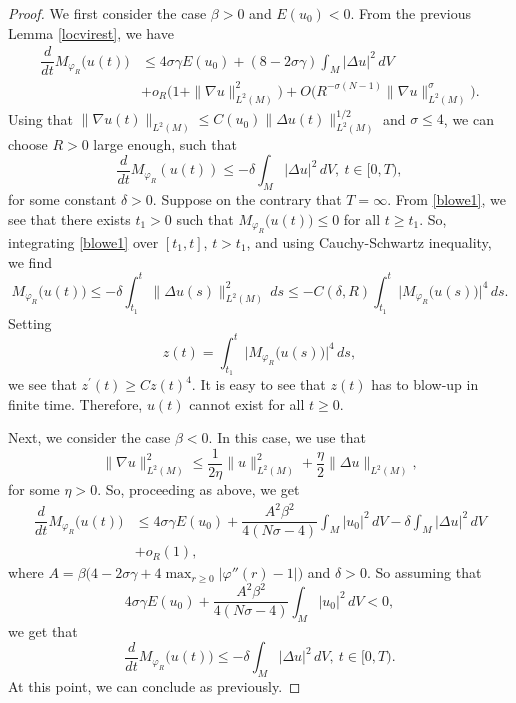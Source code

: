 \documentclass[10pt,leqno]{amsart}
\numberwithin{equation}{section}
\begin{document}
\begin{proof}
We first consider the case $\beta> 0$ and $E(u_0)<0$. From the previous Lemma \ref{locvirest}, we have
\begin{align*}
\dfrac{d}{dt}M_{\varphi_R} \big(u(t)\big)& \leq 4 \sigma \gamma E (u_0)+(8-2\sigma \gamma) \int_M |\Delta u|^2\, dV \\
& +o_R \big(1+\|\nabla u\|^2_{L^2(M)}\big)+O\big( R^{-\sigma (N-1)} \|\nabla u\|_{L^2 (M)}^{\sigma}\big). 
\end{align*}
Using that $\|\nabla u(t)\|_{L^2 (M)}\leq C(u_0) \|\Delta u (t)\|_{L^2 (M)}^{1/2} $ and $\sigma \leq 4$, we can choose $R>0$ large enough, such that
\begin{equation}
\label{blowe1}
\dfrac{d}{dt}M_{\varphi_R} (u(t)) \leq  -\delta \int_M |\Delta u|^2\, dV,\ t\in [0,T), 
\end{equation}
for some constant $\delta>0$. Suppose on the contrary  that $T=\infty$. From \eqref{blowe1}, we see that there exists $t_1 >0$ such that $M_{\varphi_R} \big(u(t)\big) \leq 0$ for all $t\geq t_1$. So, integrating \eqref{blowe1} over $[t_1 ,t]$, $t>t_1$, and using Cauchy-Schwartz inequality, we find
$$M_{\varphi_R} \big(u(t)\big) \leq -\delta \int_{t_1}^t \|\Delta u(s)\|_{L^2 (M)}^2\, ds\leq - C(\delta ,R) \int_{t_1}^t \big|M_{\varphi_R} \big(u(s)\big) \big|^4\, ds . $$
Setting 
\[
z(t)= \int_{t_1}^t \big|M_{\varphi_R} \big(u(s)\big) \big|^4\, ds,
\]
 we see that $z^\prime (t) \geq C z(t)^4$. It is easy to see that $z(t)$ has to blow-up in finite time. Therefore, $u(t)$ cannot exist for all $t\geq 0$.

Next, we consider the case $\beta<0$. In this case, we use that 
\[
\|\nabla u\|_{L^2 (M)}^2 \leq \dfrac{1}{2\eta} \|u\|_{L^2 (M)}^2 + \dfrac{\eta}{2} \|\Delta u\|_{L^2 (M)},
\]
 for some $\eta>0$. So, proceeding as above, we get
\begin{align*}
\dfrac{d}{dt}M_{\varphi_R} \big(u(t)\big)& \leq 4 \sigma \gamma E (u_0)+ \dfrac{A^2 \beta^2}{4 (N\sigma -4)} \int_M |u_0|^2\, dV -\delta \int_M |\Delta u|^2\, dV \\
& +o_R (1), 
\end{align*}
where $A=\beta \big(4- 2\sigma \gamma +4 \max_{r\geq 0} |\varphi'' (r) -1|\big) $ and $\delta >0$. So assuming that 
\[
4 \sigma \gamma E (u_0)+ \frac{A^2 \beta^2}{4 (N\sigma -4)} \int_M |u_0|^2 \,dV <0,
\]
 we get that
\begin{equation*}
\dfrac{d}{dt}M_{\varphi_R} \big(u(t)\big) \leq  -\delta \int_M |\Delta u|^2\, dV,\  t\in [0,T). 
\end{equation*}
At this point, we can conclude as previously.
\end{proof}
\end{document}
